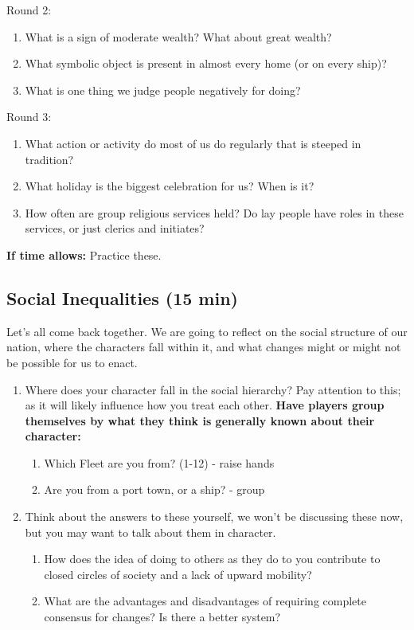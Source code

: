 \documentclass[green]{GL2020}
\begin{document}
Round 2:
\begin{enumerate}
	\item What is a sign of moderate wealth? What about great wealth?
	\item What symbolic object is present in almost every home (or on every ship)?
	\item What is one thing we judge people negatively for doing?
\end{enumerate}

Round 3:
\begin{enumerate}
	\item What action or activity do most of us do regularly that is steeped in tradition?
	\item What holiday is the biggest celebration for us? When is it?
	\item How often are group religious services held? Do lay people have roles in these services, or just clerics and initiates?
\end{enumerate}

\textbf{If time allows:} Practice these.

\subsection*{Social Inequalities (15 min)}
Let’s all come back together. We are going to reflect on the social structure of our nation, where the characters fall within it, and what changes might or might not be possible for us to enact.

\begin{enumerate}
	\item Where does your character fall in the social hierarchy? Pay attention to this; as it will likely influence how you treat each other. \textbf{Have players group themselves by what they think is generally known about their character:}
	\begin{enumerate}
		\item Which Fleet are you from? (1-12) - raise hands
		\item Are you from a port town, or a ship? - group
	\end{enumerate}
	\item Think about the answers to these yourself, we won’t be discussing these now, but you may want to talk about them in character.
	\begin{enumerate}
		\item How does the idea of doing to others as they do to you contribute to closed circles of society and a lack of upward mobility?
		\item What are the advantages and disadvantages of requiring complete consensus for changes? Is there a better system?
	\end{enumerate}
\end{enumerate}
\end{document}
